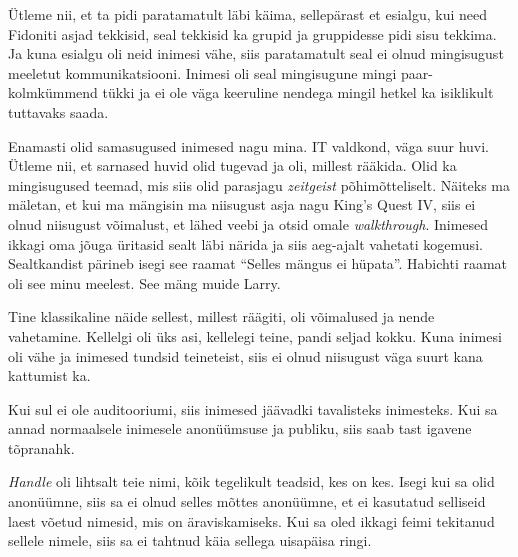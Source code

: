 
Ütleme nii, et ta pidi paratamatult läbi käima, sellepärast et esialgu, kui need Fidoniti asjad tekkisid, seal tekkisid ka grupid ja gruppidesse pidi sisu tekkima. Ja kuna esialgu oli neid inimesi vähe, siis paratamatult seal ei olnud mingisugust meeletut kommunikatsiooni. Inimesi oli seal mingisugune mingi paar-kolmkümmend tükki ja ei ole väga keeruline nendega  mingil hetkel ka isiklikult tuttavaks saada.


Enamasti olid samasugused inimesed nagu mina. IT valdkond, väga suur huvi. Ütleme nii, et sarnased huvid olid tugevad ja oli, millest rääkida. Olid ka mingisugused teemad, mis siis olid parasjagu \emph{zeitgeist} põhimõtteliselt. Näiteks ma mäletan, et kui ma mängisin ma niisugust asja nagu King's Quest IV, siis ei olnud niisugust võimalust, et lähed veebi ja otsid omale \emph{walkthrough}. Inimesed ikkagi oma jõuga üritasid sealt läbi närida ja siis aeg-ajalt vahetati kogemusi. Sealtkandist pärineb isegi see raamat \enquote{Selles mängus ei hüpata}. Habichti raamat oli see minu meelest. See mäng muide Larry.

Tine klassikaline näide sellest, millest räägiti, oli võimalused ja nende vahetamine. Kellelgi oli üks asi, kellelegi teine, pandi seljad kokku. Kuna inimesi oli vähe ja inimesed tundsid teineteist, siis ei olnud niisugust väga suurt kana kattumist ka.


Kui sul ei ole auditooriumi, siis inimesed jäävadki tavalisteks inimesteks. Kui sa annad normaalsele inimesele anonüümsuse ja publiku, siis saab tast igavene tõpranahk.
                 

\emph{Handle} oli lihtsalt teie nimi, kõik tegelikult teadsid, kes on kes. Isegi kui sa olid anonüümne, siis sa ei olnud selles mõttes anonüümne, et ei kasutatud selliseid laest võetud nimesid, mis on  äraviskamiseks. Kui sa oled ikkagi feimi tekitanud sellele nimele, siis sa ei tahtnud käia sellega uisapäisa ringi. 

